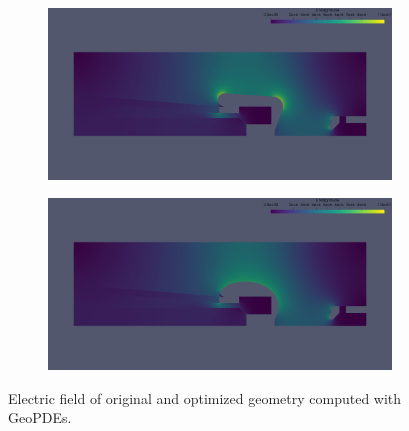 \begin{center}
\begin{figure}[H]
    \begin{subfigure}{0.45\textwidth}
        \includegraphics[width=\textwidth]{fig/png/E_init_iga}
    \end{subfigure}
    \begin{subfigure}{0.45\textwidth}
        \includegraphics[width=\textwidth]{fig/png/E_opt_order=8_iga}
    \end{subfigure}
    \caption{Electric field of original and optimized geometry computed with GeoPDEs.}
    \label{fig:E_iga}
\end{figure}
\end{center}

